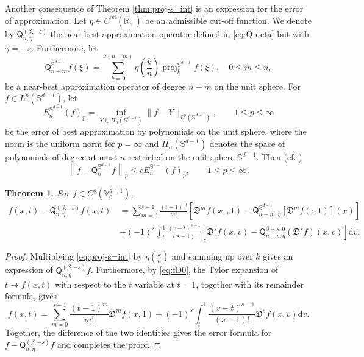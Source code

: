 \documentclass{amsart}
\newtheorem{thm}{Theorem}[section]
\theoremstyle{remark}
\def\d{\mathrm{d}}
\def\sph{{\mathbb{S}^{d-1}}}
\def\sQ{{\mathsf Q}}
\def\fD{{\mathfrak D}}
\def\b{{\beta}}
\def\g{{\gamma}}
\def\RR{{\mathbb R}}
\def\SS{{\mathbb S}}
\def\VV{{\mathbb V}}
\def\proj{\operatorname{proj}}
\begin{document}
Another consequence of Theorem \ref{thm:proj-s=int} is an expression for the error of approximation.
Let $\eta \in C^\infty(\RR_+)$ be an admissible cut-off function. We denote by $\sQ_{n,\eta}^{(\beta, -s)}$
the near best approximation operator defined in \eqref{eq:Qn-eta} but with $\g = -s$. Furthermore, let
$$
\sQ_{n-m}^\sph f (\xi)= \sum_{k=0}^{2(n-m)} \eta\left(\frac{k}{n}\right) \proj_k^\sph f(\xi), \quad 0 \le m \le n,
$$
be a near-best approximation operator of degree $n-m$ on the unit sphere. For $f\in L^p(\sph)$, let
$$
  E_n^\sph(f)_p = \inf_{Y \in \Pi_n(\sph)} \| f - Y\|_{L^p(\sph)}, \qquad 1 \le p \le \infty
$$
be the error of best approximation by polynomials on the unit sphere, where the norm is the uniform norm for
$p = \infty$ and $\Pi_n(\sph)$ denotes the space of polynomials of degree at most $n$ restricted on the unit
sphere $\sph$. Then (cf. \cite[Theorem 2.6.3.]{DaiX})
$$
   \left  \|f - \sQ_{n}^\sph f \right \|_p \le c E_n^{\sph}(f)_p, \qquad 1 \le p \le \infty.
$$

\begin{thm} \label{thm:errorSOP}
For $f \in C^s(\VV_0^{d+1})$,
\begin{align*}
  f(x,t) - \sQ_{n,\eta}^{(\beta, -s)}f(x,t)  \,& = \sum_{m=0}^{s-1} \frac{(t-1)^m}{m!} \left[ \fD^m f(x,,1)
     - \sQ_{n-m,\eta}^{\sph} \left[\fD^m f(\cdot,1)\right](x) \right] \\
   & +  (-1)^s \int_{t}^{1} \frac{(v-t)^{s-1}}{(s-1)!} \left[ \fD^s f (x, v)-
      \sQ_{n-s,\eta}^{\b+s,0}\left(\fD^s f\right) (x, v) \right] \d v.
\end{align*}

\end{thm}

\begin{proof}
Multiplying \eqref{eq:proj-s=int} by $\eta\left( \frac{k}{n} \right)$ and summing up over $k$ gives an expression
of $\sQ_{n,\eta}^{(\b,-s)} f$. Furthermore, by \eqref{eq:fD0}, the Tylor expansion of $t\rightarrow f(x,t)$ with respect to the $t$
variable at $t =1$, together with its remainder formula, gives 
$$
  f(x,t) = \sum_{m=0}^{s-1} \frac{(t-1)^m}{m!}  \fD^m f(x,1) +
   (-1)^s \int_{t}^{1} \frac{(v-t)^{s-1}}{(s-1)!} \fD^s f (x, v) \d v.
$$
Together, the difference of the two identities gives the error formula for $f -\sQ_{n,\eta}^{(\b,-s)} f$ and completes
the proof.
\end{proof}
\end{document}
